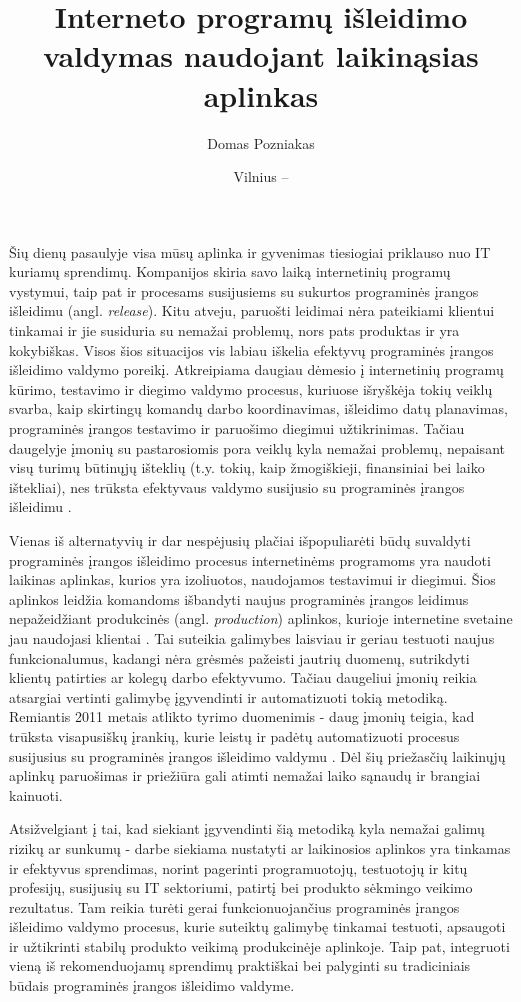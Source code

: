 \documentclass{VUMIFPSkursinis}
\institute{Informatikos institutas}
\title{Interneto programų išleidimo valdymas naudojant laikinąsias aplinkas}
\author{Domas Pozniakas}
\date{Vilnius – \the\year}
\begin{document}
\maketitle

\tableofcontents

Šių dienų pasaulyje visa mūsų aplinka ir gyvenimas tiesiogiai priklauso nuo IT kuriamų sprendimų. Kompanijos skiria savo laiką internetinių programų vystymui, taip pat ir procesams susijusiems su sukurtos programinės įrangos išleidimu (angl. \textit{release}). Kitu atveju, paruošti leidimai nėra pateikiami klientui tinkamai ir jie susiduria su nemažai problemų, nors pats produktas ir yra kokybiškas. Visos šios situacijos vis labiau iškelia efektyvų programinės įrangos išleidimo valdymo poreikį. Atkreipiama daugiau dėmesio į internetinių programų kūrimo, testavimo ir diegimo valdymo procesus, kuriuose išryškėja tokių veiklų svarba, kaip skirtingų komandų darbo koordinavimas, išleidimo datų planavimas, programinės įrangos testavimo ir paruošimo diegimui užtikrinimas. Tačiau daugelyje įmonių su pastarosiomis pora veiklų kyla nemažai problemų, nepaisant visų turimų būtinųjų išteklių (t.y. tokių, kaip žmogiškieji, finansiniai bei laiko ištekliai), nes trūksta efektyvaus valdymo susijusio su programinės įrangos išleidimu \cite{SaltPirmas}. 


Vienas iš alternatyvių ir dar nespėjusių plačiai išpopuliarėti būdų suvaldyti programinės įrangos išleidimo procesus internetinėms programoms yra naudoti laikinas aplinkas, kurios yra izoliuotos, naudojamos testavimui ir diegimui. Šios aplinkos leidžia komandoms išbandyti naujus programinės įrangos leidimus nepažeidžiant produkcinės (angl. \textit{production}) aplinkos, kurioje internetine svetaine jau naudojasi klientai \cite{SaltAntras}. Tai suteikia galimybes laisviau ir geriau testuoti naujus funkcionalumus, kadangi nėra grėsmės pažeisti jautrių duomenų, sutrikdyti klientų patirties ar kolegų darbo efektyvumo. Tačiau daugeliui įmonių reikia atsargiai vertinti galimybę įgyvendinti ir automatizuoti tokią metodiką. Remiantis 2011 metais atlikto tyrimo duomenimis - daug įmonių teigia, kad trūksta visapusiškų įrankių, kurie leistų ir padėtų automatizuoti procesus susijusius su programinės įrangos išleidimo valdymu \cite{SaltPirmas}. Dėl šių priežasčių laikinųjų aplinkų paruošimas ir priežiūra gali atimti nemažai laiko sąnaudų ir brangiai kainuoti.

 Atsižvelgiant į tai, kad siekiant įgyvendinti šią metodiką kyla nemažai galimų rizikų ar sunkumų - darbe siekiama nustatyti ar laikinosios aplinkos yra tinkamas ir efektyvus sprendimas, norint pagerinti programuotojų, testuotojų ir kitų profesijų, susijusių su IT sektoriumi, patirtį bei produkto sėkmingo veikimo rezultatus. Tam reikia turėti gerai funkcionuojančius programinės įrangos išleidimo valdymo procesus, kurie suteiktų galimybę tinkamai testuoti, apsaugoti ir užtikrinti stabilų produkto veikimą produkcinėje aplinkoje. Taip pat, integruoti vieną iš rekomenduojamų sprendimų praktiškai bei palyginti su tradiciniais būdais programinės įrangos išleidimo valdyme.
\end{document}
